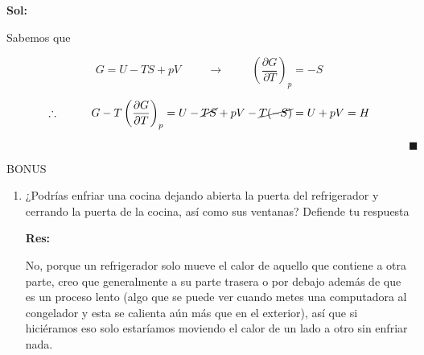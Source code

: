\documentclass[12pt,a4paper]{article}
\begin{document}
\begin{enumerate}
\textbf{Sol:}

Sabemos que

\begin{equation}
    G = U - TS + pV \hspace{1cm} \rightarrow \hspace{1cm} \left(\frac{\partial G}{\partial T}\right)_{p} = - S
\end{equation}

\begin{equation}
    \therefore \hspace{1cm} G - T \left(\frac{\partial G}{\partial T}\right)_{p} = U - \cancel{TS} + pV -\cancel{ T(-S)} = U + pV = H
\end{equation}

\begin{equation*}
    \hspace{15cm}  \blacksquare
\end{equation*}


\end{enumerate}

BONUS

\begin{enumerate}






    \item ¿Podrías enfriar una cocina dejando abierta la puerta del refrigerador y cerrando la puerta de la cocina, así como sus ventanas? Defiende tu respuesta
    
    \textbf{Res:}
    
    No, porque un refrigerador solo mueve el calor de aquello que contiene a otra parte, creo que generalmente a su parte trasera o por debajo además de que es un proceso lento (algo que se puede ver cuando metes una computadora al congelador y esta se calienta aún más que en el exterior), así que si hiciéramos eso solo estaríamos moviendo el calor de un lado a otro sin enfriar nada.
\end{enumerate}
\end{document}
